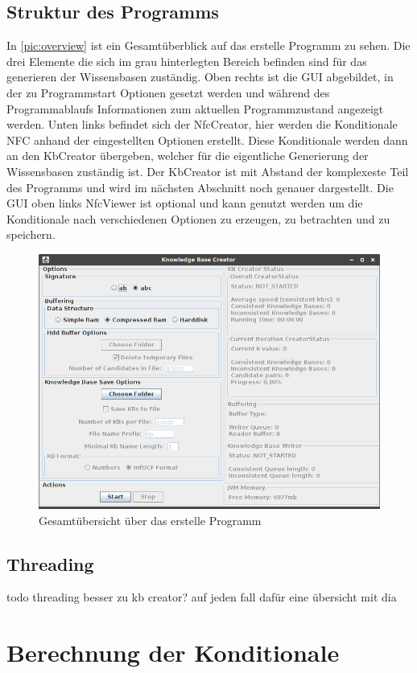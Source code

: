 \documentclass[12pt,a4paper]{article}
\begin{document}
\subsection{Struktur des Programms}
In \autoref{pic:overview} ist ein Gesamtüberblick auf das erstelle Programm zu sehen. Die drei Elemente die sich im grau hinterlegten Bereich befinden sind für das generieren der Wissensbasen zuständig. Oben rechts ist die GUI abgebildet, in der zu Programmstart Optionen gesetzt werden und während des Programmablaufs Informationen zum aktuellen Programmzustand angezeigt werden. Unten links befindet sich der NfcCreator, hier werden die Konditionale NFC anhand der eingestellten Optionen erstellt. Diese Konditionale werden dann an den KbCreator übergeben, welcher für die eigentliche Generierung der Wissensbasen zuständig ist. Der KbCreator ist mit Abstand der komplexeste Teil des Programms und wird im nächsten Abschnitt noch genauer dargestellt. Die GUI oben links NfcViewer ist optional und kann genutzt werden um die Konditionale nach verschiedenen Optionen zu erzeugen, zu betrachten und zu speichern.
\begin{figure}
\includegraphics[width=0.7\linewidth]{bilder/overview.png}

\caption{Gesamtübersicht über das erstelle Programm}
\label{pic:overview}
\end{figure}



\subsection{Threading}
todo
threading besser zu kb creator? auf jeden fall dafür eine übersicht mit dia

\section{Berechnung der Konditionale}
\end{document}
